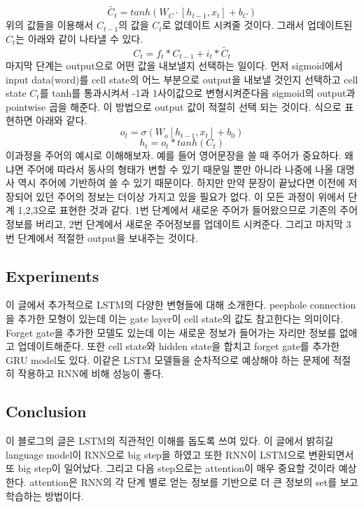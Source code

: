 \documentclass[extendedabs]{bmvc2k}
\begin{document}
 $$ \tilde{C_t} = tanh(W_C \cdot [h_{t-1}, x_t] + b_C)$$
 위의 값들을 이용해서 $C_{t-1}$의 값을 $C_t$로 없데이트 시켜줄 것이다. 그래서 업데이트된 $C_t$는 아래와 같이 나타낼 수 있다.
 $$ C_t = f_t * C_{t-1} + i_t * \tilde{C_t}$$
 마지막 단계는 output으로 어떤 값을 내보낼지 선택하는 일이다. 먼저 sigmoid에서 input data(word)를  cell state의 어느 부분으로 output을 내보낼 것인지 선택하고 
 cell state $C_t$를 tanh를 통과시켜서 -1과 1사이값으로 변형시켜준다음 sigmoid의 output과 pointwise 곱을 해준다. 이 방법으로 output 값이 적절히 선택 되는 것이다.
 식으로 표현하면 아래와 같다.
 $$ o_t = \sigma (W_o [h_{t-1},x_t]+b_0) $$
 $$ h_t = o_t * tanh(C_t)$$
  이과정을 주어의 예시로 이해해보자. 예를 들어 영어문장을 쓸 때 주어가 중요하다. 왜냐면 주어에 따라서 
 동사의 형태가 변할 수 있기 때문일 뿐만 아니라 나중에 나올 대명사 역시 주어에 기반하여 쓸 수 있기 때문이다. 하지만 만약 문장이
 끝났다면 이전에 저장되어 있던 주어의 정보는 더이상 가지고 있을 필요가 없다. 이 모든 과정이 위에서 단계 1,2,3으로 표현한 것과 같다.
 1번 단계에서 새로운 주어가 들어왔으므로 기존의 주어 정보를 버리고, 2번 단계에서 새로운 주어정보를 업데이트 시켜준다. 그리고 마지막 3번 단계에서 적절한
 output을 보내주는 것이다.

 \subsection{Experiments}
  이 글에서 추가적으로 LSTM의 다양한 변형들에 대해 소개한다. peephole connection을 추가한 모형이 있는데 이는 gate layer이 cell state의 값도 참고한다는 의미이다.
  Forget gate을 추가한 모델도 있는데 이는 새로운 정보가 들어가는 자리만 정보를 없애고 업데이트해준다. 또한 cell state와 hidden state을 합치고
  forget gate를 추가한 GRU model도 있다. 이같은 LSTM 모델들을 순차적으로 예상해야 하는 문제에 적절히 작용하고 RNN에 비해 성능이 좋다. 

 \subsection{Conclusion}
\quad 이 블로그의 글은 LSTM의 직관적인 이해를 돕도록 쓰여 있다. 이 글에서 밝히길 language model이 RNN으로 big step을 하였고 또한 RNN이 LSTM으로 변환되면서
또 big step이 일어났다. 그리고 다음 step으로는 attention이 매우 중요할 것이라 예상한다. attention은 RNN의 각 단계 별로 얻는 정보를 기반으로 더 큰 정보의 set를 보고 학습하는 방법이다.

\newpage

\end{document}
